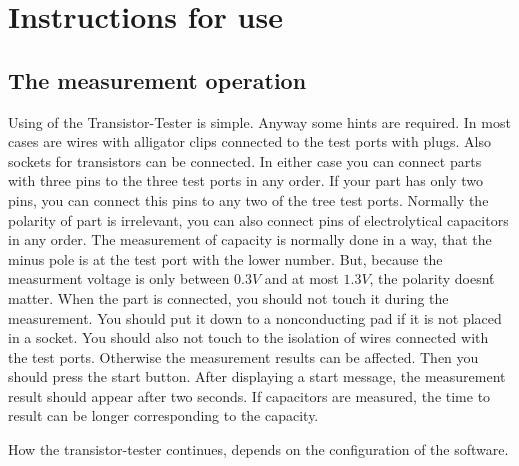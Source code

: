 \chapter{Instructions for use}
\label{sec:manual}
\section{The measurement operation}
Using of the Transistor-Tester is simple.
Anyway some hints are required.
In most cases are wires with alligator clips connected to the test ports with plugs.
Also sockets for transistors can be connected.
In either case you can connect parts with three pins to the three test ports in any order.
If your part has only two pins, you can connect this pins to any two of the tree test ports.
Normally the polarity of part is irrelevant, you can also connect pins of electrolytical capacitors in any order. 
The measurement of capacity is normally done in a way, that the minus pole is at the test port with the lower number.
But, because the measurment voltage is only between \(0.3V\) and at most \(1.3V\), the polarity doesn\'t matter.
When the part is connected, you should not touch it during the measurement. You should put it down to a nonconducting pad
if it is not placed in a socket. You should also not touch to the isolation of wires connected with the test ports.
Otherwise the measurement results can be affected.
Then you should press the start button.
After displaying a start message, the measurement result should appear after two seconds.
If capacitors are measured, the time to result can be longer corresponding to the capacity.

How the transistor-tester continues, depends on the configuration of the software.

